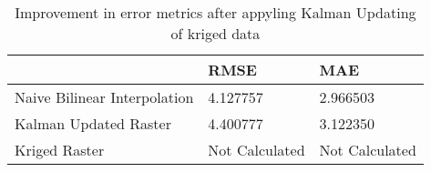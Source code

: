 \begin{table}
\caption{Improvement in error metrics after appyling Kalman Updating of kriged data}
\label{tab:Oahu4_lidar_error}
\begin{tabular}{lll}
\toprule
 & RMSE & MAE \\
\midrule
Naive Bilinear Interpolation & 4.127757 & 2.966503 \\
Kalman Updated Raster & 4.400777 & 3.122350 \\
Kriged Raster & Not Calculated & Not Calculated \\
\bottomrule
\end{tabular}
\end{table}
